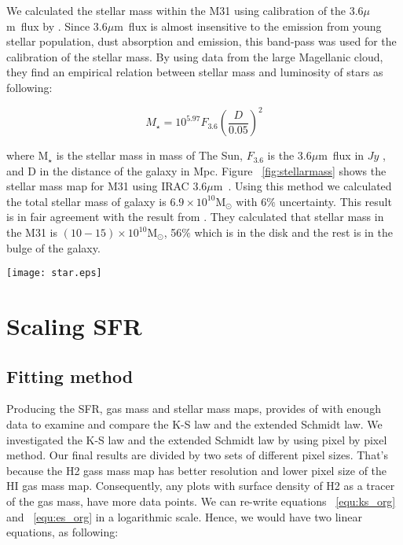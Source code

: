 \documentclass[useAMS,usenatbib]{mn2e}
\newcommand \um    {$\mu$m\ }
\begin{document}
We calculated the stellar mass within the M31 using calibration of the 3.6\um flux by \cite{Eskew12}.  Since 3.6\um flux is almost insensitive to the emission from young stellar population, dust absorption and emission, this band-pass was used for the calibration of the stellar mass. By using data from the large Magellanic cloud, they find an empirical relation between stellar mass and luminosity of stars as following:

\begin{equation}
\label{equ:eskew}
M _{\star}= 10^{5.97} F_{3.6}(\frac{D}{0.05})^2
\end{equation}

where M$_{\star}$ is the stellar mass in mass of The Sun, $F_{3.6}$ is the 3.6\um flux in $Jy$ , and D in the distance of the galaxy in Mpc. Figure ~\ref{fig:stellarmass} shows the stellar mass map for M31 using IRAC 3.6\um. Using this method we calculated the total stellar mass of galaxy is $6.9 \times 10^{10}$M$_{\odot}$ with 6$\%$ uncertainty. This result is in fair agreement with the result from \cite{Tamm2012}. They calculated that stellar mass in the M31 is $(10-15) \times 10^{10}$M$_{\odot}$, 56$\%$ which is in the disk and the rest is in the bulge of the galaxy.   %
\begin{figure*}
\centering
\texttt{[image: star.eps]}
\caption{Stellar Mass surface density. This mass is produced using $IRAC$ 3.6 $\mu$ m data and its calibration presented in equation ~\ref{equ:eskew}}
\label{fig:stellarmass}
\end{figure*}


\section{Scaling SFR}
\subsection{Fitting method}
\label{sec:fittinhg}
Producing the SFR, gas mass and stellar mass maps, provides of with enough data to examine and compare the K-S law and the extended Schmidt law.%
We investigated the K-S law and the extended Schmidt law by using  pixel by pixel method.  Our final results are divided by two sets of different pixel sizes. That's because the H2 gass mass map has better resolution and lower pixel size of the  HI gas mass map. Consequently, any plots with surface density of H2 as a tracer of the gas mass, have more data points.%
We can re-write equations ~\ref{equ:ks_org} and ~\ref{equ:es_org} in a logarithmic scale. Hence, we would have two linear equations, as following:
\end{document}
